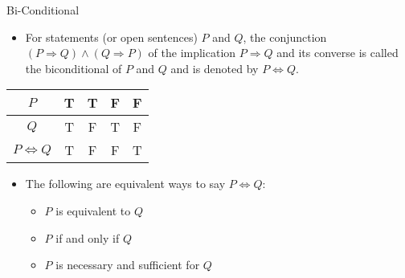 \documentclass{beamer}
\begin{document}
\begin{frame}{Bi-Conditional}
\begin{itemize}
    \item For statements (or open sentences) $P$ and $Q$, the conjunction $(P \Rightarrow Q) \land (Q \Rightarrow P)$ of the implication $P \Rightarrow Q$ and its converse is called the biconditional of $P$ and $Q$ and is denoted by $P \Leftrightarrow Q$.
\end{itemize}

\begin{center}
\begin{tabular}{|c|c|c|c|c|}
    \hline
    $P$ & T & T & F & F \\
    \hline
    $Q$ & T & F & T & F \\
    \hline
    $P \Leftrightarrow Q$ & T & F & F & T \\
    \hline
\end{tabular}
\end{center}

\begin{itemize}
    \item The following are equivalent ways to say $P \Leftrightarrow Q$:
    \begin{itemize}
        \item $P$ is equivalent to $Q$
        \item $P$ if and only if $Q$
        \item $P$ is necessary and sufficient for $Q$
    \end{itemize}
\end{itemize}
\end{frame}
\end{document}

